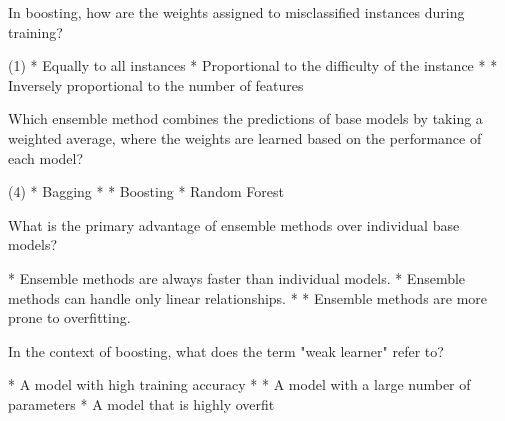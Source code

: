 \documentclass[10pt]{extarticle}
\begin{document}
\begin{exercise}
    In boosting, how are the weights assigned to misclassified instances during training?
    \begin{choice} (1)
        * Equally to all instances
        * Proportional to the difficulty of the instance
        * 
        * Inversely proportional to the number of features
    \end{choice}
\end{exercise}
\begin{solution}
\end{solution}

\begin{exercise}
    Which ensemble method combines the predictions of base models by taking a weighted average, where the weights are learned based on the performance of each model?
    \begin{choice}(4)
        * Bagging
        * 
        * Boosting
        * Random Forest
    \end{choice}
\end{exercise}
\begin{solution}
\end{solution}

\begin{exercise}
    What is the primary advantage of ensemble methods over individual base models?
    \begin{choice}
        * Ensemble methods are always faster than individual models.
        * Ensemble methods can handle only linear relationships.
        * 
        * Ensemble methods are more prone to overfitting.
    \end{choice}
\end{exercise}
\begin{solution}
\end{solution}

\begin{exercise}
    In the context of boosting, what does the term "weak learner" refer to?
    \begin{choice}
        * A model with high training accuracy
        * 
        * A model with a large number of parameters
        * A model that is highly overfit
    \end{choice}
\end{exercise}
\begin{solution}
\end{solution}
\end{document}
